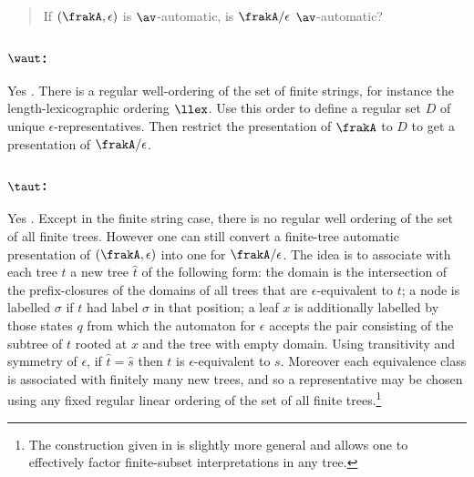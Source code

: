 \begin{quote}
If $(\frakA,\epsilon)$ is $\av$-automatic, is $\frakA/\epsilon$ $\av$-automatic?
\end{quote}

\subsubsection*{$\waut$:} Yes \cite{BlGr00}.
There is a regular well-ordering of the set of finite strings, for instance the length-lexicographic
ordering $\llex$. Use this order to define a regular set $D$ of unique $\epsilon$-representatives.
Then restrict the presentation of $\frakA$ to $D$ to get a presentation of $\frakA / \epsilon$.

\subsubsection*{$\taut$:} Yes \cite{CoLo07}.
Except in the finite string case, there is no regular well ordering of the set of
all finite trees. 
However one can still convert a finite-tree automatic presentation of $(\frakA,\epsilon)$ into
one for $\frakA/\epsilon$. The idea is to associate with each tree $t$ a
new tree $\hat{t}$ of the following form: the domain is the intersection 
of the prefix-closures of the domains of all trees that are $\epsilon$-equivalent to $t$; 
a node is labelled $\sigma$ if $t$ had label $\sigma$ in that position; 
a leaf $x$ is additionally labelled by those states $q$ from which the 
automaton for ${\epsilon}$ accepts the pair consisting of the subtree of $t$ 
rooted at $x$ and the tree with empty domain.
Using transitivity and symmetry of $\epsilon$, if $\hat{t} = \hat{s}$ 
then $t$ is $\epsilon$-equivalent to $s$. 
Moreover each equivalence class is associated with finitely many new trees, 
and so a representative may be chosen using any fixed regular linear ordering 
of the set of all finite trees.\footnote{The construction 
given in \cite{CoLo07} is slightly more general and allows one to effectively 
factor finite-subset interpretations in any tree.}




